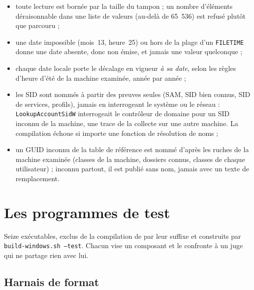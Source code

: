 \documentclass[11pt,a4paper,oneside]{report}
\begin{document}
\begin{itemize}
  \item toute lecture est bornée par la taille du tampon ; un nombre
    d'éléments déraisonnable dans une liste de valeurs (au-delà de 65~536) est
    refusé plutôt que parcouru ;
  \item une date impossible (mois~13, heure~25) ou hors de la plage d'un
    \texttt{FILETIME} donne une date absente, donc non émise, et jamais une
    valeur quelconque ;
  \item chaque date locale porte le décalage en vigueur \emph{à sa date},
    selon les règles d'heure d'été de la machine examinée, année par année ;
  \item les SID sont nommés à partir des preuves seules (SAM, SID bien connus,
    SID de services, profils), jamais en interrogeant le système ou le réseau :
    \texttt{LookupAccountSidW} interrogeait le contrôleur de domaine pour un
    SID inconnu de la machine, une trace de la collecte sur une autre machine.
    La compilation échoue si  importe une fonction de
    résolution de noms ;
  \item un GUID inconnu de la table de référence est nommé d'après les ruches
    de la machine examinée (classes de la machine, dossiers connus, classes de
    chaque utilisateur) ; inconnu partout, il est publié sans nom, jamais avec
    un texte de remplacement.
\end{itemize}

\chapter{Les programmes de test}\label{ch:harnais}

Seize exécutables, exclus de la compilation de \wac{} par leur suffixe
 et construits par \texttt{build-windows.sh --test}.
Chacun vise un composant et le confronte à un juge qui ne partage rien avec
lui.

\section{Harnais de format}
\end{document}
